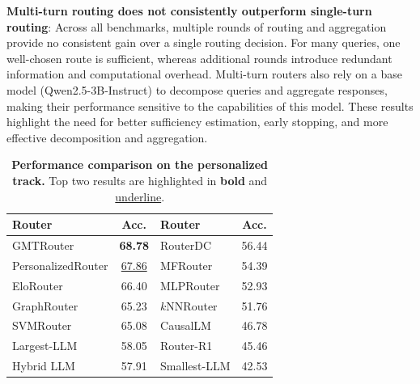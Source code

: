 \noindent\textbf{Multi-turn routing does not consistently outperform single-turn routing}:
Across all benchmarks, multiple rounds of routing and aggregation provide no consistent gain over a single routing decision. For many queries, one well-chosen route is sufficient, whereas additional rounds introduce redundant information and computational overhead. Multi-turn routers also rely on a base model (Qwen2.5-3B-Instruct) to decompose queries and aggregate responses, making their performance sensitive to the capabilities of this model. These results highlight the need for better sufficiency estimation, early stopping, and more effective decomposition and aggregation.



\begin{table}
\vspace{-12pt}
\centering
\caption{\textbf{Performance comparison on the personalized track.} Top two results are highlighted in \textbf{bold} and \underline{underline}.}
\label{tab:personalized}
\small
\setlength{\tabcolsep}{4pt}
\begin{tabular}{lc|lc}
\toprule
\textbf{Router} & \textbf{Acc.} & \textbf{Router} & \textbf{Acc.} \\
\midrule
GMTRouter & \textbf{68.78} & RouterDC & 56.44 \\
PersonalizedRouter & \underline{67.86} & MFRouter & 54.39 \\
EloRouter & 66.40 & MLPRouter & 52.93 \\
GraphRouter & 65.23 & $k$NNRouter & 51.76 \\
SVMRouter & 65.08 & CausalLM & 46.78 \\
Largest-LLM & 58.05 & Router-R1 & 45.46 \\
Hybrid LLM & 57.91 & Smallest-LLM & 42.53 \\
\bottomrule
\end{tabular}
\vspace{-10pt}
\end{table}

